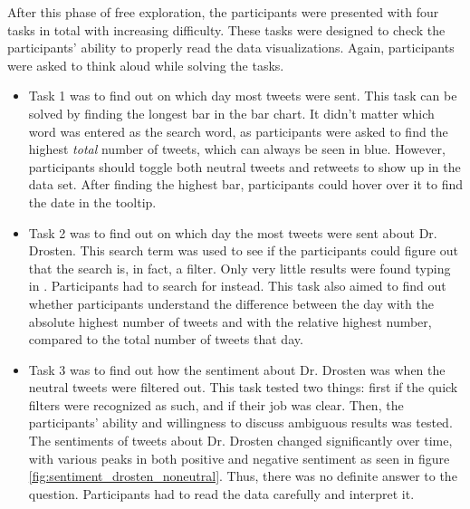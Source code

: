 After this phase of free exploration, the participants were presented with four tasks in total with increasing difficulty. These tasks were designed to check the participants' ability to properly read the data visualizations. Again, participants were asked to think aloud while solving the tasks.
    \begin{itemize}
        \item Task 1 was to find out on which day most tweets were sent. This task can be solved by finding the longest bar in the bar chart. It didn't matter which word was entered as the search word, as participants were asked to find the highest \emph{total} number of tweets, which can always be seen in blue. However, participants should toggle both neutral tweets and retweets to show up in the data set. After finding the highest bar, participants could hover over it to find the date in the tooltip.
        \item Task 2 was to find out on which day the most tweets were sent about Dr. Drosten. This search term was used to see if the participants could figure out that the search is, in fact, a filter. Only very little results were found typing in . Participants had to search for  instead. This task also aimed to find out whether participants understand the difference between the day with the absolute highest number of tweets and with the relative highest number, compared to the total number of tweets that day.
        \item Task 3 was to find out how the sentiment about Dr. Drosten was when the neutral tweets were filtered out. This task tested two things: first if the quick filters were recognized as such, and if their job was clear. Then, the participants' ability and willingness to discuss ambiguous results was tested. The sentiments of tweets about Dr. Drosten changed significantly over time, with various peaks in both positive and negative sentiment as seen in figure \ref{fig:sentiment_drosten_noneutral}. Thus, there was no definite answer to the question. Participants had to read the data carefully and interpret it.
        \begin{figure}[h!tb]

\end{figure}
\end{itemize}
